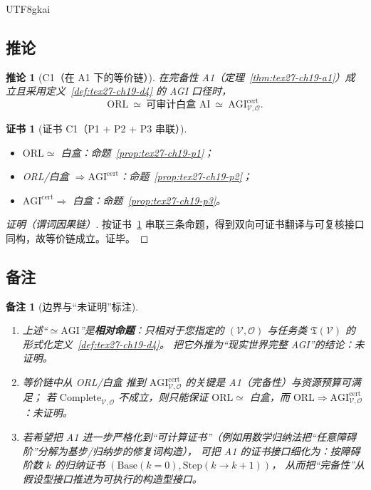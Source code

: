 \documentclass[12pt]{article}
\newtheorem{corollary}{推论}[section]
\newtheorem{remark}{备注}[section]
\newtheorem{Certificate}{证书}[section]
\begin{document}
\begin{CJK*}{UTF8}{gkai}
\subsection{推论}
\label{subsec:tex27-ch19-corollary}

\begin{corollary}[C1（在 A1 下的等价链）]
\label{cor:tex27-ch19-c1}
在完备性 A1（定理~\ref{thm:tex27-ch19-a1}）成立且采用定义~\ref{def:tex27-ch19-d4} 的 AGI 口径时，
\[
  \mathrm{ORL}\ \simeq\ \text{可审计白盒 AI}\ \simeq\ \mathrm{AGI}^{\mathrm{cert}}_{\mathcal{V},\mathcal{O}}.
\]
\end{corollary}

\begin{Certificate}[证书 C1（P1 + P2 + P3 串联）]
\label{cert:tex27-ch19-c1}
\begin{itemize}
  \item $\mathrm{ORL}\simeq$ 白盒：命题~\ref{prop:tex27-ch19-p1}；
  \item ORL/白盒 $\Rightarrow \mathrm{AGI}^{\mathrm{cert}}$：命题~\ref{prop:tex27-ch19-p2}；
  \item $\mathrm{AGI}^{\mathrm{cert}}\Rightarrow$ 白盒：命题~\ref{prop:tex27-ch19-p3}。
\end{itemize}
\end{Certificate}

\begin{proof}[证明（谓词因果链）]
按证书~\ref{cert:tex27-ch19-c1} 串联三条命题，得到双向可证书翻译与可复核接口同构，故等价链成立。证毕。
\end{proof}

\subsection{备注}
\label{subsec:tex27-ch19-remarks}

\begin{remark}[边界与“未证明”标注]
\label{rem:tex27-ch19-r1}
\begin{enumerate}
  \item 上述“$\simeq \mathrm{AGI}$”是\textbf{相对命题}：只相对于您指定的 $(\mathcal{V},\mathcal{O})$ 与任务类 $\mathfrak{T}(\mathcal{V})$
    的形式化定义~\ref{def:tex27-ch19-d4}。
  把它外推为“现实世界完整 AGI”的结论：未证明。
  \item 等价链中从 ORL/白盒 推到 $\mathrm{AGI}^{\mathrm{cert}}_{\mathcal{V},\mathcal{O}}$ 的关键是 A1（完备性）与资源预算可满足；
  若 $\mathrm{Complete}_{\mathcal{V},\mathcal{O}}$ 不成立，则只能保证 $\mathrm{ORL}\simeq$ 白盒，而 $\mathrm{ORL}\Rightarrow
    \mathrm{AGI}^{\mathrm{cert}}_{\mathcal{V},\mathcal{O}}$：未证明。
  \item 若希望把 A1 进一步严格化到“可计算证书”（例如用数学归纳法把“任意障碍阶”分解为基步/归纳步的修复词构造），
  可把 A1 的证书接口细化为：按障碍阶数 $k$ 的归纳证书 $(\mathrm{Base}(k=0),\mathrm{Step}(k\to k+1))$，
  从而把“完备性”从假设型接口推进为可执行的构造型接口。
\end{enumerate}
\end{remark}


\end{CJK*}
\end{document}
